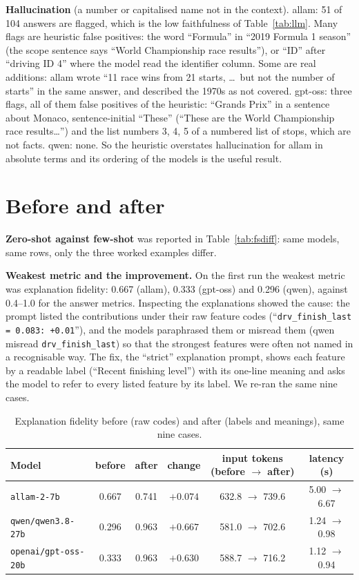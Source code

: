 \documentclass[10pt,a4paper]{article}
\newcommand{\code}[1]{\texttt{#1}}
\begin{document}
\textbf{Hallucination} (a number or capitalised name not in the context). allam: 51 of 104 answers are flagged, which is the low faithfulness of Table~\ref{tab:llm}. Many flags are heuristic false positives: the word ``Formula'' in ``2019 Formula 1 season'' (the scope sentence says ``World Championship race results''), or ``ID'' after ``driving ID 4'' where the model read the identifier column. Some are real additions: allam wrote ``11 race wins from 21 starts, \ldots\ but not the number of starts'' in the same answer, and described the 1970s as not covered. gpt-oss: three flags, all of them false positives of the heuristic: ``Grands Prix'' in a sentence about Monaco, sentence-initial ``These'' (``These are the World Championship race results\ldots'') and the list numbers 3, 4, 5 of a numbered list of stops, which are not facts. qwen: none. So the heuristic overstates hallucination for allam in absolute terms and its ordering of the models is the useful result.

\section{Before and after}

\textbf{Zero-shot against few-shot} was reported in Table~\ref{tab:fsdiff}: same models, same rows, only the three worked examples differ.

\textbf{Weakest metric and the improvement.} On the first run the weakest metric was explanation fidelity: 0.667 (allam), 0.333 (gpt-oss) and 0.296 (qwen), against 0.4--1.0 for the answer metrics. Inspecting the explanations showed the cause: the prompt listed the contributions under their raw feature codes (``\code{drv\_finish\_last = 0.083: +0.01}''), and the models paraphrased them or misread them (qwen misread \code{drv\_finish\_last}) so that the strongest features were often not named in a recognisable way. The fix, the ``strict'' explanation prompt, shows each feature by a readable label (``Recent finishing level'') with its one-line meaning and asks the model to refer to every listed feature by its label. We re-ran the same nine cases.

\begin{table}[H]
\centering\small
\caption{Explanation fidelity before (raw codes) and after (labels and meanings), same nine cases.}\label{tab:expl}
\begin{tabular}{lccccc}
\toprule
Model & before & after & change & input tokens (before $\rightarrow$ after) & latency (s) \\
\midrule
\code{allam-2-7b} & 0.667 & 0.741 & $+0.074$ & 632.8 $\rightarrow$ 739.6 & 5.00 $\rightarrow$ 6.67 \\
\code{qwen/qwen3.8-27b} & 0.296 & 0.963 & $+0.667$ & 581.0 $\rightarrow$ 702.6 & 1.24 $\rightarrow$ 0.98 \\
\code{openai/gpt-oss-20b} & 0.333 & 0.963 & $+0.630$ & 588.7 $\rightarrow$ 716.2 & 1.12 $\rightarrow$ 0.94 \\
\bottomrule
\end{tabular}
\end{table}
\end{document}
